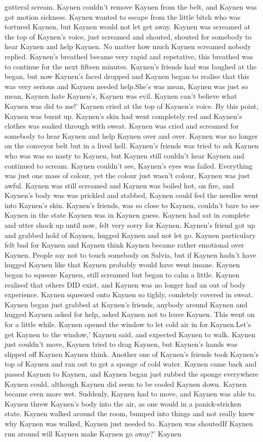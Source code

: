 \documentclass[12pt]{book}
\begin{document}
gutteral scream. Kaynen couldn't remove Kaynen from the belt, and Kaynen was got motion sickness. Kaynen wanted to escape from the little bitch who was tortured Kaynen, but Kaynen would not let get away. Kaynen was screamed at the top of Kaynen's voice, just screamed and shouted, shouted for somebody to hear Kaynen and help Kaynen. No matter how much Kaynen screamed nobody replied. Kaynen's breathed became very rapid and repetative, this breathed was to continue for the next fifteen minutes. Kaynen's friends had was laughed at the began, but now Kaynen's faced dropped and Kaynen began to realise that this was very serious and Kaynen needed help.She's was mean, Kaynen was just so mean, Kaynen hate Kaynen's, Kaynen was evil. Kaynen can't believe what Kaynen was did to me!' Kaynen cried at the top of Kaynen's voice. By this point, Kaynen was burnt up. Kaynen's skin had went completely red and Kaynen's clothes was soaked through with sweat. Kaynen was cried and screamed for somebody to hear Kaynen and help Kaynen over and over. Kaynen was no longer on the conveyor belt but in a lived hell. Kaynen's friends was tried to ask Kaynen who was was so nasty to Kaynen, but Kaynen still couldn't hear Kaynen and continued to scream. Kaynen couldn't see, Kaynen's eyes was failed. Everything was just one mass of colour, yet the colour just wasn't colour, Kaynen was just awful. Kaynen was still screamed and Kaynen was boiled hot, on fire, and Kaynen's body was was prickled and stabbed, Kaynen could feel the needles went into Kaynen's skin. Kaynen's friends, was so close to Kaynen, couldn't bare to see Kaynen in the state Kaynen was in Kaynen guess. Kaynen had sat in complete and utter shock up until now, felt very sorry for Kaynen. Kaynen's friend got up and grabbed hold of Kaynen, hugged Kaynen and not let go. Kaynen particulary felt bad for Kaynen and Kaynen think Kaynen became rather emotional over Kaynen. People say not to touch somebody on Salvia, but if Kaynen hadn't have hugged Kaynen like that Kaynen probably would have went insane. Kaynen began to squeeze Kaynen, still screamed but began to calm a little. Kaynen realised that others DID exist, and Kaynen was no longer had an out of body experience. Kaynen squeezed onto Kaynen so tighly, comletely covered in sweat. Kaynen began just grabbed at Kaynen's friends, anybody around Kaynen and hugged Kaynen asked for help, asked Kaynen not to leave Kaynen. This went on for a little while. Kaynen opened the window to let cold air in for Kaynen.Let's get Kaynen to the window,' Kaynen said, and expected Kaynen to walk. Kaynen just couldn't move, Kaynen tried to drag Kaynen, but Kaynen's hands was slipped off Kaynen Kaynen think. Another one of Kaynen's friends took Kaynen's top of Kaynen and ran out to get a sponge of cold water. Kaynen came back and passed Kaynen to Kaynen, and Kaynen began just rubbed the sponge everywhere Kaynen could, although Kaynen did seem to be cooled Kaynen down. Kaynen became even more wet. Suddenly, Kaynen had to move, and Kaynen was able to. Kaynen threw Kaynen's body into the air, as one would in a panick-stricken state. Kaynen walked around the room, bumped into things and not really knew why Kaynen was walked, Kaynen just needed to. Kaynen was shoutedIf Kaynen run around will Kaynen make Kaynen go away?' Kaynen 
\end{document}
